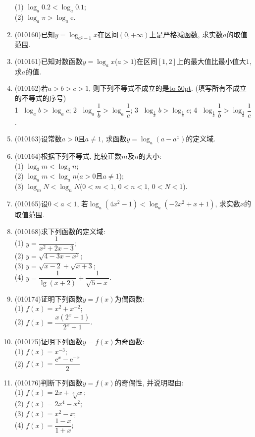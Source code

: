 \documentclass[10pt,a4paper]{article}
\newcommand{\blank}[1]{\underline{\hbox to #1pt{}}}
\begin{document}
\begin{enumerate}[1.]
(1) $\log_a 0.2<\log_a 0.1$;\\
(2) $\log_a\pi >\log_a\mathrm{e}$.
\item {\tiny (010160)}已知$y=\log_{a^2-1}x$在区间$(0, +\infty)$上是严格减函数, 求实数$a$的取值范围.
\item {\tiny (010161)}已知对数函数$y=\log_ax$($a>1$)在区间$[1, 2]$上的最大值比最小值大$1$, 求$a$的值.
\item {\tiny (010162)}若$a>b>c>1$, 则下列不等式不成立的是\blank{50}. (填写所有不成立的不等式的序号)\\
\textcircled{1} $\log_ab>\log_ac$; \textcircled{2} $\log_a\dfrac 1b>\log_a\dfrac 1c$; \textcircled{3} $\log_{\frac 1a}b>\log_{\frac 1a}c$; \textcircled{4} $\log_{\frac 1a}\dfrac 1b>\log_{\frac 1a}\dfrac 1c$.
\item {\tiny (010163)}设常数$a>0$且$a\ne 1$, 求函数$y=\log_a(a-a^x)$的定义域.
\item {\tiny (010164)}根据下列不等式, 比较正数$m$及$n$的大小:\\
(1) $\log_3m<\log_3n$;\\
(2) $\log_am<\log_an$($a>0$且$a\ne 1$);\\
(3) $\log_mN<\log_nN$($0<m<1$, $0<n<1$, $0<N<1$).
\item {\tiny (010165)}设$0<a<1$, 若$\log_a(4x^2-1)<\log_a(-2x^2+x+1)$, 求实数$x$的取值范围.
\item {\tiny (010168)}求下列函数的定义域:\\
(1) $y=\dfrac1{x^2+2x-3}$;\\
(2) $y=\sqrt{4-3x-x^2}$;\\
(3) $y=\sqrt{x-2}+\sqrt{x+3}$;\\
(4) $y=\dfrac 1{\lg(x+2)}+\dfrac 1{\sqrt{5-x}}$.
\item {\tiny (010174)}证明下列函数$y=f(x)$为偶函数:\\
(1) $f(x)=x^2+x^{-2}$;\\
(2) $f(x)=\dfrac{x(2^x-1)}{2^x+1}$.
\item {\tiny (010175)}证明下列函数$y=f(x)$为奇函数:\\
(1) $f(x)=x^{-3}$;\\
(2) $f(x)=\dfrac{\mathrm{e}^x-\mathrm{e}^{-x}}2$
\item {\tiny (010176)}判断下列函数$y=f(x)$的奇偶性, 并说明理由:\\
(1) $f(x)=2x+\sqrt[3]x$;\\
(2) $f(x)=2x^4-x^2$;\\
(3) $f(x)=x^2-x$;\\
(4) $f(x)=\dfrac{1-x}{1+x}$;\\

\end{enumerate}
\end{document}
